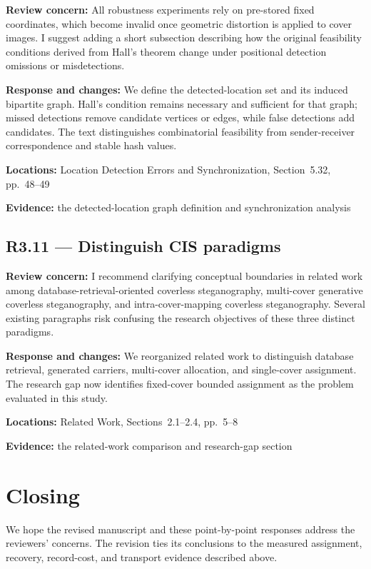 \documentclass[12pt,a4paper]{article}
\newcommand{\revcomment}[1]{\par\medskip\noindent\textbf{Review concern:} #1\par\smallskip}
\newcommand{\responsechanges}[1]{\par\noindent\textbf{Response and changes:} #1\par}
\newcommand{\locations}[1]{\par\noindent\textbf{Locations:} #1\par}
\newcommand{\evidence}[1]{\par\noindent\textbf{Evidence:} #1\par\smallskip}
\begin{document}
\revcomment{All robustness experiments rely on pre-stored fixed coordinates, which become invalid once geometric distortion is applied to cover images. I suggest adding a short subsection describing how the original feasibility conditions derived from Hall's theorem change under positional detection omissions or misdetections.}
\responsechanges{We define the detected-location set and its induced bipartite graph. Hall's condition remains necessary and sufficient for that graph; missed detections remove candidate vertices or edges, while false detections add candidates. The text distinguishes combinatorial feasibility from sender-receiver correspondence and stable hash values.}
\locations{Location Detection Errors and Synchronization, Section~5.32, pp.~48--49}
\evidence{the detected-location graph definition and synchronization analysis}

\subsection*{R3.11 --- Distinguish CIS paradigms}

\revcomment{I recommend clarifying conceptual boundaries in related work among database-retrieval-oriented coverless steganography, multi-cover generative coverless steganography, and intra-cover-mapping coverless steganography. Several existing paragraphs risk confusing the research objectives of these three distinct paradigms.}
\responsechanges{We reorganized related work to distinguish database retrieval, generated carriers, multi-cover allocation, and single-cover assignment. The research gap now identifies fixed-cover bounded assignment as the problem evaluated in this study.}
\locations{Related Work, Sections~2.1--2.4, pp.~5--8}
\evidence{the related-work comparison and research-gap section}

\section*{Closing}
We hope the revised manuscript and these point-by-point responses address the reviewers' concerns. The revision ties its conclusions to the measured assignment, recovery, record-cost, and transport evidence described above.
\end{document}
